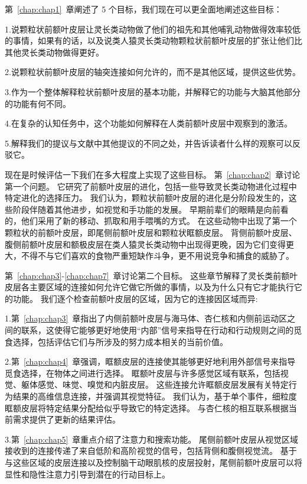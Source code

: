 第~\ref{chap:chap1}~章阐述了 5 个目标，我们现在可以更全面地阐述这些目标：
\par
1.说颗粒状前额叶皮层让灵长类动物做了他们的祖先和其他哺乳动物做得效率较低的事情，如果有的话，以及说类人猿灵长类动物颗粒状前额叶皮层的扩张让他们比其他灵长类动物做得更好。
\par
2.说颗粒状前额叶皮层的轴突连接如何允许的，而不是其他区域，提供这些优势。
\par
3.作为一个整体解释粒状前额叶皮层的基本功能，并解释它的功能与大脑其他部分的功能有何不同。
\par 
4.在复杂的认知任务中，这个功能如何解释在人类前额叶皮层中观察到的激活。
\par 
5.解释我们的提议与文献中其他提议的不同之处，并告诉读者什么样的观察可以反驳它。
\par 
现在是时候评估一下我们在多大程度上实现了这些目标。
第~\ref{chap:chap2}~章讨论第一个问题。
它研究了前额叶皮层的进化，包括一些导致灵长类动物进化过程中特定进化的选择压力。
我们认为，颗粒状前额叶皮层的进化是分阶段发生的，这些阶段伴随着其他进步，如视觉和手功能的发展。
早期前辈们的眼睛是向前看的，他们采用了新的移动、抓取和用手喂嘴的方式。
在这些动物中出现了第一个颗粒状的前额叶皮层，即尾侧前额叶皮层和颗粒状眶额皮层。
背侧前额叶皮层、腹侧前额叶皮层和额极皮层在类人猿灵长类动物中出现得更晚，因为它们变得更大，不得不与它们喜欢的食物严重短缺作斗争，更不用说竞争和捕食的威胁了。
\par 
第~\ref{chap:chap3}-\ref{chap:chap7}~章讨论第二个目标。
这些章节解释了灵长类前额叶皮层各主要区域的连接如何允许它做它所做的事情，以及为什么只有它才能执行它的功能。
我们逐个检查前额叶皮层的区域，因为它的连接因区域而异:
\par 
1.第~\ref{chap:chap3}~章指出了内侧前额叶皮层与海马体、杏仁核和内侧前运动区之间的联系，这使得它能够更好地使用“内部”信号来指导在行动和行动规则之间的觅食选择，包括评估它们与所涉及的努力成本相关的当前价值。
\par 
2.第~\ref{chap:chap4}~章强调，眶额皮层的连接使其能够更好地利用外部信号来指导觅食选择，在物体之间进行选择。
眶额叶皮层与许多感觉区域有联系，包括视觉、躯体感觉、味觉、嗅觉和内脏皮层。
这些连接允许眶额皮层发展有关特定行为结果的高维信息连接，并强调其视觉特征。
我们认为，基于单个事件，细粒度眶额皮层将特定结果分配给似乎导致它的特定选择。
与杏仁核的相互联系根据当前需求提供了更新的结果评估。
\par 
3.第~\ref{chap:chap5}~章重点介绍了注意力和搜索功能。
尾侧前额叶皮层从视觉区域接收到的连接传递了来自低阶和高阶视觉的信号，包括背侧和腹侧视觉流。
基于与这些区域的皮层连接以及控制脑干动眼肌核的皮层投射，尾侧前额叶皮层可以将显性和隐性注意力引导到潜在的行动目标上。
